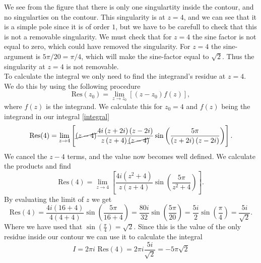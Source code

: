 \documentclass[12pt,twoside]{article}
\begin{document}
We see from the figure that there is only one singulartity inside the contour, and no singularties on the contour. This singularity is at $z=4$, and we can see that it is a simple pole since it is of order $1$, but we have to be carefull to check that this is not a removable singularity. We must check that for $z=4$ the sine factor is not equal to zero, which could have removed the singularity. For $z=4$ the sine-argument is $5\pi/20=\pi/4$, which will make the sine-factor equal to $\sqrt{2}$. Thus the singularity at $z=4$ is not removable.\\
To calculate the integral we only need to find the integrand's residue at $z=4$. We do this by using the following procedure
\begin{equation}
  \text{Res}(z_0) = \lim_{z \to z_0} \left[(z-z_0)f(z)\right],
\end{equation}
where $f(z)$ is the integrand. We calculate this for $z_0=4$ and $f(z)$ being the integrand in our integral \eqref{integral}
\begin{equation}
    \text{Res}(4) = \lim_{z \to 4}\left[\cancel{(z-4)}\frac{4i\left(z+2i\right)\left(z-2i\right)}{z\left(z+4\right)\cancel{\left(z-4\right)}}\sin{\left( \frac{5\pi}{\left(z+2i\right)\left(z-2i\right)} \right)}\right].
\end{equation}
We cancel the $z-4$ terms, and the value now becomes well defined. We calculate the products and find
\begin{equation}
    \text{Res}(4) = \lim_{z \to 4}\left[\frac{4i\left(z^2+4\right)}{z\left(z+4\right)}\sin{\left( \frac{5\pi}{z^2+4} \right)}\right].
\end{equation}
By evaluating the limit of $z$ we get
\begin{equation}
    \text{Res}(4) = \frac{4i\left(16+4\right)}{4\left(4+4\right)}\sin{\left( \frac{5\pi}{16+4} \right)} = \frac{80i}{32}\sin{\left( \frac{5\pi}{20} \right)} = \frac{5i}{2}\sin{\left(\frac{\pi}{4}\right)} = \frac{5i}{\sqrt{2}}.
\end{equation}
Where we have used that $\sin{\left(\frac{\pi}{4}\right)}=\sqrt{2}$. Since this is the value of the only residue inside our contour we can use it to calculate the integral
\begin{equation}
  I  = 2\pi i\,\,\text{Res}(4) = 2\pi i\frac{5i}{\sqrt{2}} = -5\pi\sqrt{2}
\end{equation}
\end{document}
